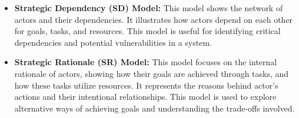 \begin{itemize}
    \item \textbf{Strategic Dependency (SD) Model:} This model shows the network of actors and their dependencies.
    It illustrates how actors depend on each other for goals, tasks, and resources.
    This model is useful for identifying critical dependencies and potential vulnerabilities in a system.
    \item \textbf{Strategic Rationale (SR) Model:} This model focuses on the internal rationale of actors, showing how their goals are achieved through tasks, and how these tasks utilize resources.
    It represents the reasons behind actor's actions and their intentional relationships.
    This model is used to explore alternative ways of achieving goals and understanding the trade-offs involved.
\end{itemize}

